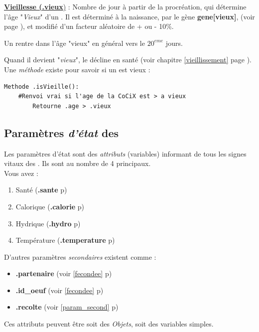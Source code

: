 \documentclass[french]{report}
\begin{document}
\begin{description}
\item \underline{\textbf{Vieillesse (.vieux})} : Nombre de jour à partir de la procréation, qui détermine l'âge  "\textit{Vieux}" d'un \CoCiX. \label{vieillesse}
Il est déterminé à la naissance, par le gène \textbf{gene[vieux]}, (voir page \pageref{liste_gene}), et modifié d'un facteur aléatoire de + ou - 10\%.

Un \CoCiX rentre dans l'âge "vieux" en général vers le $20^{eme}$ jours.

Quand il devient "\emph{vieux}", le \CoCiX décline en santé (voir chapitre \ref{vieillissement} page \pageref{vieillissement}).\\
Une \emph{méthode} existe pour savoir si un \CoCiX est vieux : \\

\begin{lstlisting}
Methode .isVieille():
	#Renvoi vrai si l'age de la CoCiX est > a vieux
		Retourne .age > .vieux
\end{lstlisting}	
\end{description}


\subsection{Paramètres \textit{d'état} des \CoCiX}\label{param_etat}
Les paramètres d'état sont des \textit{attributs} (variables) informant de tous les signes vitaux des \CoCiX. Ils sont au nombre de 4 principaux.\\

Vous avez : 
\begin{enumerate}
\item Santé (\textbf{.sante} p\pageref{sante})
\item Calorique (\textbf{.calorie} p\pageref{alimentation})
\item Hydrique (\textbf{.hydro} p\pageref{hydro})
\item Température (\textbf{.temperature} p\pageref{temperature})
\end{enumerate}
D'autres paramètres \textit{secondaires} existent comme :
\begin{itemize}
	\item \textbf{.partenaire} (voir \ref{fecondee} p\pageref{fecondee})
	\item  \textbf{.id\_oeuf} (voir \ref{fecondee} p\pageref{fecondee})
	\item \textbf{.recolte} (voir \ref{param_second} p\pageref{param_second})
\end{itemize}
Ces attributs peuvent être soit des \textit{Objets}, soit des variables simples.
\end{document}
